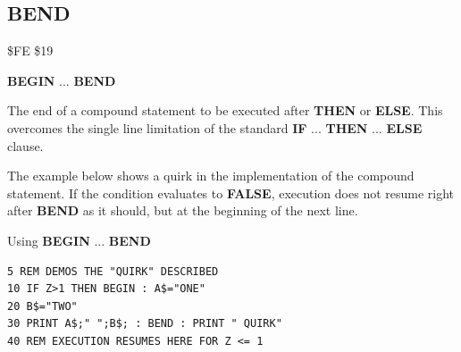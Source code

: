 \subsection{BEND}
\begin{description}[leftmargin=2cm,style=nextline]
\item [Token:]   \$FE \$19

\item [Format:]  {\bf BEGIN} ... {\bf BEND}

\item [Usage:]   The end of a compound statement to be executed after {\bf THEN} or {\bf ELSE}. This overcomes the single line limitation of the standard {\bf IF} ... {\bf THEN} ... {\bf ELSE} clause.

\item [Remarks:] The example below shows a quirk in the implementation of the compound statement. If the condition evaluates to {\bf FALSE}, execution does not resume right after {\bf BEND} as it should, but at the beginning of the next line.

\item [Example:] Using {\bf BEGIN} ... {\bf BEND}

\begin{tcolorbox}[colback=black,coltext=white]
\verbatimfont{\codefont}
\begin{verbatim}
5 REM DEMOS THE "QUIRK" DESCRIBED
10 IF Z>1 THEN BEGIN : A$="ONE"
20 B$="TWO"
30 PRINT A$;" ";B$; : BEND : PRINT " QUIRK"
40 REM EXECUTION RESUMES HERE FOR Z <= 1
\end{verbatim}
\end{tcolorbox}
\end{description}


\newpage
